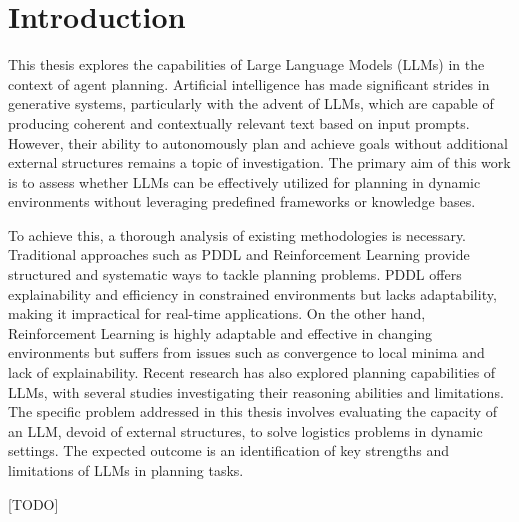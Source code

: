 \chapter{Introduction}
\label{cha:introduction}

This thesis explores the capabilities of Large Language Models (LLMs) in the
context of agent planning. Artificial intelligence has made significant strides in
generative systems, particularly with the advent of LLMs, which are capable of producing
coherent and contextually relevant text based on input prompts. However, their ability
to autonomously plan and achieve goals without additional external structures remains
a topic of investigation. The primary aim of this work is to assess whether LLMs
can be effectively utilized for planning in dynamic environments without
leveraging predefined frameworks or knowledge bases.

To achieve this, a thorough analysis of existing methodologies is necessary.
Traditional approaches such as PDDL and Reinforcement Learning provide
structured and systematic ways to tackle planning problems. PDDL offers explainability
and efficiency in constrained environments but lacks adaptability, making it
impractical for real-time applications. On the other hand, Reinforcement
Learning is highly adaptable and effective in changing environments but suffers
from issues such as convergence to local minima and lack of explainability. Recent
research has also explored planning capabilities of LLMs, with several studies
investigating their reasoning abilities and limitations. The specific problem addressed
in this thesis involves evaluating the capacity of an LLM, devoid of external
structures, to solve logistics problems in dynamic settings. The expected
outcome is an identification of key strengths and limitations of LLMs in
planning tasks.

[TODO]